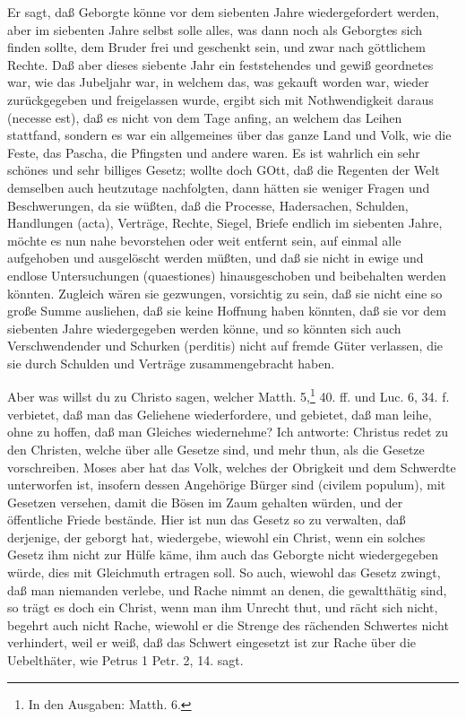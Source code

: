 Er sagt, daß Geborgte könne vor dem siebenten Jahre wiedergefordert werden, aber im siebenten Jahre selbst solle alles, was dann noch als Geborgtes sich finden sollte, dem Bruder frei und geschenkt sein, und zwar nach göttlichem Rechte. Daß aber dieses siebente Jahr ein feststehendes und gewiß geordnetes war, wie das Jubeljahr war, in welchem das, was gekauft worden war, wieder zurückgegeben und freigelassen wurde, ergibt sich mit Nothwendigkeit daraus (necesse est), daß es nicht von dem Tage anfing, an welchem das Leihen stattfand, sondern es war ein allgemeines über das ganze Land und Volk, wie die Feste, das Pascha, die Pfingsten und andere waren. Es ist wahrlich ein sehr schönes und sehr billiges Gesetz; wollte doch GOtt, daß die Regenten der Welt demselben auch heutzutage nachfolgten, dann hätten sie weniger Fragen und Beschwerungen, da sie wüßten, daß die Processe, Hadersachen, Schulden, Handlungen (acta), Verträge, Rechte, Siegel, Briefe endlich im siebenten Jahre, möchte es nun nahe bevorstehen oder weit entfernt sein, auf einmal alle aufgehoben und ausgelöscht werden müßten, und daß sie nicht in ewige und endlose Untersuchungen (quaestiones) hinausgeschoben und beibehalten werden könnten. Zugleich wären sie gezwungen, vorsichtig zu sein, daß sie nicht eine so große Summe ausliehen, daß sie keine Hoffnung haben könnten, daß sie vor dem siebenten Jahre wiedergegeben werden könne, und so könnten sich auch Verschwendender und Schurken (perditis) nicht auf fremde Güter verlassen, die sie durch Schulden und Verträge zusammengebracht haben.

Aber was willst du zu Christo sagen, welcher Matth. 5,\footnote{In den Ausgaben: Matth. 6.} 40. ff. und Luc. 6, 34. f. verbietet, daß man das Geliehene wiederfordere, und gebietet, daß man leihe, ohne zu hoffen, daß man Gleiches wiedernehme? Ich antworte: Christus redet zu den Christen, welche über alle Gesetze sind, und mehr thun, als die Gesetze vorschreiben. Moses aber hat das Volk, welches der Obrigkeit und dem Schwerdte unterworfen ist, insofern dessen Angehörige Bürger sind (civilem populum), mit Gesetzen versehen, damit die Bösen im Zaum gehalten würden, und der öffentliche Friede bestände. Hier ist nun das Gesetz so zu verwalten, daß derjenige, der geborgt hat, wiedergebe, wiewohl ein Christ, wenn ein solches Gesetz ihm nicht zur Hülfe käme, ihm auch das Geborgte nicht wiedergegeben würde, dies mit Gleichmuth ertragen soll. So auch, wiewohl das Gesetz zwingt, daß man niemanden
verlebe, und Rache nimmt an denen, die gewaltthätig sind, so trägt es doch ein Christ, wenn man ihm Unrecht thut, und rächt sich nicht, begehrt auch nicht Rache, wiewohl er die Strenge des rächenden Schwertes nicht verhindert, weil er weiß, daß das Schwert eingesetzt ist zur Rache über die Uebelthäter, wie Petrus 1 Petr. 2, 14. sagt.

